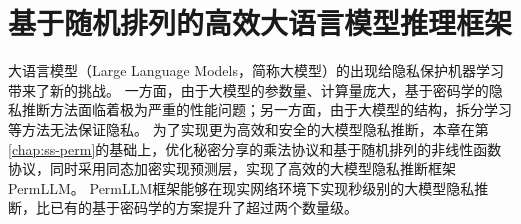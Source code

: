 \chapter{基于随机排列的高效大语言模型推理框架}
大语言模型（Large Language Models，简称大模型）的出现给隐私保护机器学习带来了新的挑战。
%
一方面，由于大模型的参数量、计算量庞大，基于密码学的隐私推断方法面临着极为严重的性能问题；另一方面，由于大模型的结构，拆分学习等方法无法保证隐私。
%
为了实现更为高效和安全的大模型隐私推断，本章在第\ref{chap:ss-perm}的基础上，优化秘密分享的乘法协议和基于随机排列的非线性函数协议，同时采用同态加密实现预测层，实现了高效的大模型隐私推断框架PermLLM。
%
PermLLM框架能够在现实网络环境下实现秒级别的大模型隐私推断，比已有的基于密码学的方案提升了超过两个数量级。







